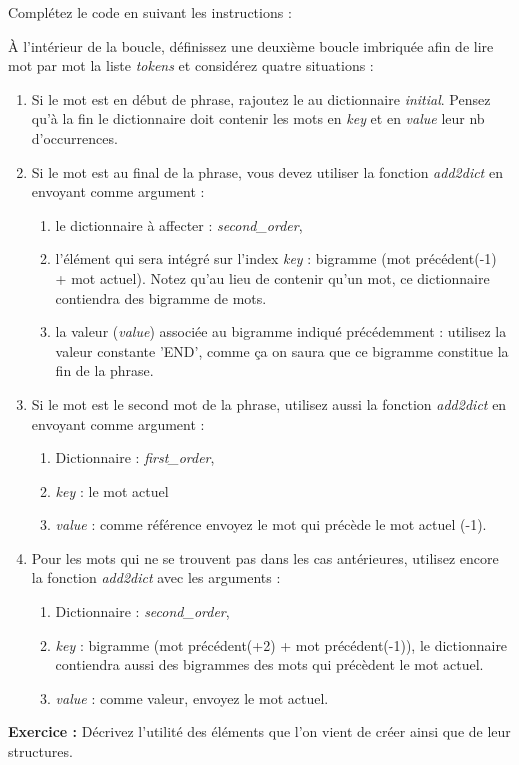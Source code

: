 Complétez le code en suivant les instructions :

À l’intérieur de la boucle, définissez une deuxième boucle imbriquée afin de lire mot par mot la liste \textit{tokens} et considérez quatre situations :
\begin{enumerate}
	\item Si le mot est en début de phrase, rajoutez le au dictionnaire \textit{initial}. Pensez qu'à la fin le dictionnaire doit contenir les mots en \textit{key} et en \textit{value} leur nb d'occurrences.
	\item Si le mot est au final de la phrase, vous devez utiliser la fonction \textit{add2dict} en envoyant comme argument :
	\begin{enumerate}
		\item le dictionnaire à affecter : \textit{second\_order},
		\item l'élément qui sera intégré sur l'index \textit{key} : bigramme (mot précédent(-1) + mot actuel). Notez qu'au lieu de contenir qu'un mot, ce dictionnaire contiendra des bigramme de mots.
		\item la valeur (\textit{value}) associée au bigramme indiqué précédemment : utilisez la valeur constante 'END', comme ça on saura que ce bigramme constitue la fin de la phrase.
	\end{enumerate}
	\item Si le mot est le second mot de la phrase, utilisez aussi la fonction \textit{add2dict} en envoyant comme argument :
	\begin{enumerate}
		\item Dictionnaire : \textit{first\_order},
		\item \textit{key} : le mot actuel
		\item \textit{value} : comme référence envoyez le mot qui précède le mot actuel (-1).
	\end{enumerate}
	\item Pour les mots qui ne se trouvent pas dans les cas antérieures, utilisez encore la fonction \textit{add2dict} avec les arguments :
	\begin{enumerate}
		\item Dictionnaire : \textit{second\_order},
		\item \textit{key} : bigramme (mot précédent(+2) + mot précédent(-1)), le dictionnaire contiendra aussi des bigrammes des mots qui précèdent le mot actuel.
		\item \textit{value} : comme valeur, envoyez le mot actuel.
	\end{enumerate}
\end{enumerate}

\textbf{Exercice :}
Décrivez l'utilité des éléments que l'on vient de créer ainsi que de leur structures.